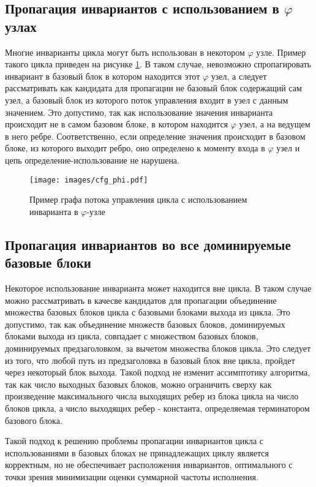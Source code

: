 \subsection{Пропагация инвариантов с использованием в $\varphi$ узлах}

Многие инварианты цикла могут быть использован в некотором $\varphi$ узле.
Пример такого цикла приведен на рисунке \ref{fig:cfg_phi}.
В таком случае, невозможно спропагировать инвариант в базовый блок в котором находится этот $\varphi$ узел, а следует рассматривать как кандидата для пропагации не базовый блок содержащий сам узел, а базовый блок из которого поток управления входит в узел с данным значением.
Это допустимо, так как использование значения инварианта происходит не в самом базовом блоке, в котором находится $\varphi$ узел, а на ведущем в него ребре.
Соответственно, если определение значения происходит в базовом блоке, из которого выходит ребро, оно определено к моменту входа в $\varphi$ узел и цепь определение-использование не нарушена.

\begin{figure}
    \centering
    \texttt{[image: images/cfg\_phi.pdf]}
    \caption{Пример графа потока управления цикла с использованием инварианта в $\varphi$-узле}
    \label{fig:cfg_phi}
\end{figure}

\subsection{Пропагация инвариантов во все доминируемые базовые блоки}

Некоторое использование инварианта может находится вне цикла.
В таком случае можно рассматривать в качесве кандидатов для пропагации объединение множества базовых блоков цикла с базовыми блоками выхода из цикла.
Это допустимо, так как объединение множеств базовых блоков, доминируемых блоками выхода из цикла, совпадает с множеством базовых блоков, доминируемых предзаголовком, за вычетом множества блоков цикла.
Это следует из того, что любой путь из предзаголовка в базовый блок вне цикла, пройдет через некоторый блок выхода.
Такой подход не изменит ассимптотику алгоритма, так как число выходных базовых блоков, можно ограничить сверху как произведение максимального числа выходящих ребер из блока цикла на число блоков цикла, а число выходящих ребер - константа, определяемая терминатором базового блока.

Такой подход к решению проблемы пропагации инвариантов цикла с использованиями в базовых блоках не принадлежащих циклу является корректным, но не обеспечивает расположения инвариантов, оптимального с точки зрения минимизации оценки суммарной частоты исполнения.

